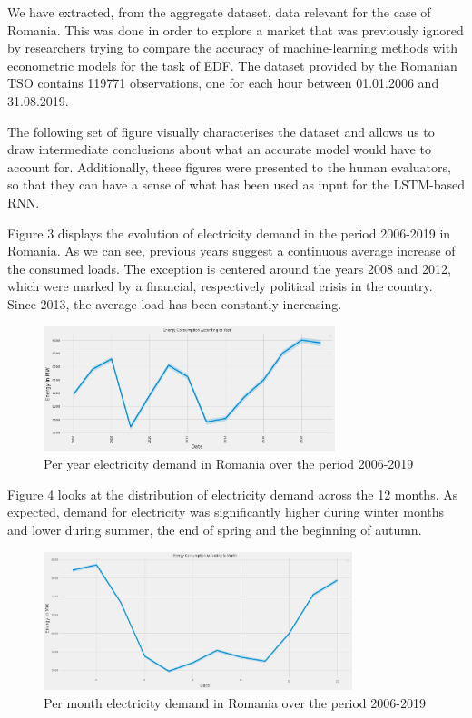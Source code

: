\documentclass[10pt,twocolumn,letterpaper]{article}
\begin{document}
 We have extracted, from the aggregate dataset, data relevant for the case of Romania. This was done in order to explore a market that was previously ignored by researchers trying to compare the accuracy of machine-learning methods with econometric models for the task of EDF. The dataset provided by the Romanian TSO contains 119771 observations, one for each hour between 01.01.2006 and 31.08.2019.

The following set of figure visually characterises the dataset and allows us to draw intermediate conclusions  about what an accurate model would have to account for. Additionally, these figures were presented to the human evaluators, so that they can have a sense of what has been used as input for the LSTM-based RNN.

Figure 3 displays the evolution of electricity demand in the period 2006-2019 in Romania. As we can see, previous years suggest a continuous average increase of the consumed loads. 
The exception is centered around the years 2008 and 2012, which were marked by a financial, respectively political crisis in the country. Since 2013, the average load has been constantly increasing.
\begin{figure}[H]
\begin{center}
   \includegraphics[width=8.5cm]{final-report-latex/Figure1.png}
   \caption{Per year electricity demand in Romania over the period 2006-2019}
   \end{center}
\end{figure}
Figure 4 looks at the distribution of electricity demand across the 12 months. As expected, demand for electricity was significantly higher during winter months and lower during summer, the end of spring and the beginning of autumn.

\begin{figure}[H]
\begin{center}
   \includegraphics[width=9cm]{final-report-latex/Month.png}
   \caption{Per month electricity demand in Romania over the period 2006-2019}
   \end{center}
\end{figure}
\end{document}
